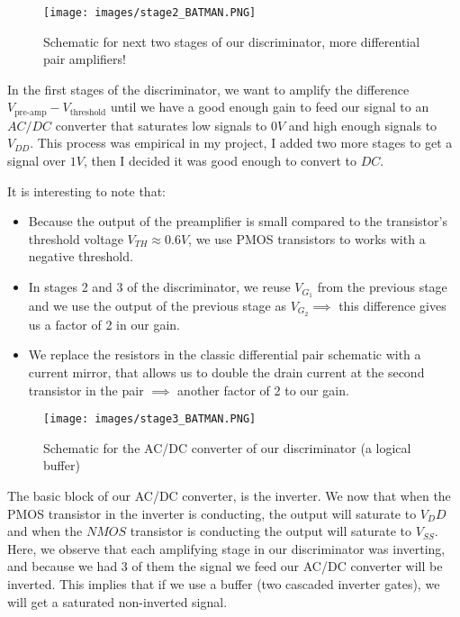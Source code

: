 \documentclass[a4paper,12pt,twoside]{article}
\begin{document}
	\begin{figure}[h!]
		\centering
		\texttt{[image: images/stage2\_BATMAN.PNG]}
		\label{diffPairBATMAN2}
		\caption{Schematic for next two stages of our discriminator, more differential pair amplifiers!}
	\end{figure}
	
	In the first stages of the discriminator, we want to amplify the difference $V_{\text{pre-amp}} - V_{\text{threshold}}$ until we have a good enough gain to feed our signal to an $AC/DC$ converter that saturates low signals to $0V$ and high enough signals to $V_{DD}$. This process was empirical in my project, I added two more stages to get a signal over $1V$, then I decided it was good enough to convert to $DC$.
	
	It is interesting to note that:
	
	\begin{itemize}
		\item Because the output of the preamplifier is small compared to the transistor's threshold voltage $V_{TH} \approx 0.6V$, we use PMOS transistors to works with a negative threshold.
		\item In stages 2 and 3 of the discriminator, we reuse $V_{G_1}$ from the previous stage and we use the output of the previous stage as $V_{G_2} \implies$ this difference gives us a factor of 2 in our gain.
		\item We replace the resistors in the classic differential pair schematic with a current mirror, that allows us to double the drain current at the second transistor in the pair $\implies$ another factor of 2 to our gain.
	\end{itemize}
	
	\begin{figure}[h!]
		\centering
		\texttt{[image: images/stage3\_BATMAN.PNG]}
		\label{stageBATMAN3}
		\caption{Schematic for the AC/DC converter of our discriminator (a logical buffer)}
	\end{figure}
	
	The basic block of our AC/DC converter, is the inverter. We now that when the PMOS transistor in the inverter is conducting, the output will saturate to $V_DD$ and when the $NMOS$ transistor is conducting the output will saturate to $V_{SS}$. Here, we observe that each amplifying stage in our discriminator was inverting, and because we had 3 of them the signal we feed our AC/DC converter will be inverted. This implies that if we use a buffer (two cascaded inverter gates), we will get a saturated non-inverted signal.
	
\end{document}
